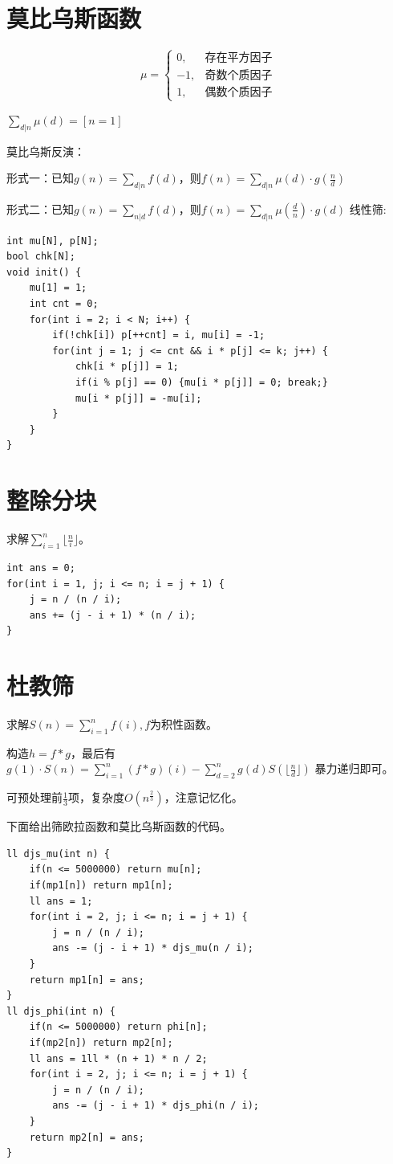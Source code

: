 \documentclass[a4paper,11pt,twoside,fontset = fandol,UTF8]{ctexbook} %
\begin{document}
	\section{莫比乌斯函数}
	$$
	\mu=\left\{
	\begin{aligned}
	0,&\text{存在平方因子}\\
	-1,&\text{奇数个质因子}\\
	1,&\text{偶数个质因子}
	\end{aligned}
	\right.
	$$
	
	$\sum_{d|n}\mu(d)=[n=1]$
	
	
	莫比乌斯反演：
	
	形式一：已知$g(n)=\sum_{d|n}f(d)$，则$f(n)=\sum_{d|n}\mu(d)\cdot g(\frac{n}{d})$
	
	形式二：已知$g(n)=\sum_{n|d}f(d)$，则$f(n)=\sum_{d|n}\mu(\frac{d}{n})\cdot g(d)$
	线性筛:
	\begin{lstlisting}
int mu[N], p[N];
bool chk[N];
void init() {
    mu[1] = 1;
    int cnt = 0;
    for(int i = 2; i < N; i++) {
        if(!chk[i]) p[++cnt] = i, mu[i] = -1;
        for(int j = 1; j <= cnt && i * p[j] <= k; j++) {
            chk[i * p[j]] = 1;
            if(i % p[j] == 0) {mu[i * p[j]] = 0; break;}
            mu[i * p[j]] = -mu[i];
        }
    }
} 
	\end{lstlisting}
	\section{整除分块}
	求解$\sum_{i=1}^n\lfloor\frac{n}{i}\rfloor$。
	\begin{lstlisting}
int ans = 0;
for(int i = 1, j; i <= n; i = j + 1) {
    j = n / (n / i);
    ans += (j - i + 1) * (n / i);
}
	\end{lstlisting}
	\section{杜教筛}
	求解$S(n)=\sum_{i=1}^n f(i),f$为积性函数。
	
	构造$h=f*g$，最后有$g(1)\cdot S(n)=\sum_{i=1}^n (f*g)(i)-\sum_{d=2}^n g(d)S(\lfloor\frac{n}{d}\rfloor)$
	暴力递归即可。
	
	可预处理前$\frac{1}{3}$项，复杂度$O(n^\frac{2}{3})$，注意记忆化。
	
	下面给出筛欧拉函数和莫比乌斯函数的代码。
	\begin{lstlisting}
ll djs_mu(int n) {
    if(n <= 5000000) return mu[n];
    if(mp1[n]) return mp1[n];
    ll ans = 1;
    for(int i = 2, j; i <= n; i = j + 1) {
        j = n / (n / i);
        ans -= (j - i + 1) * djs_mu(n / i);
    }
    return mp1[n] = ans;
}
ll djs_phi(int n) {
    if(n <= 5000000) return phi[n];
    if(mp2[n]) return mp2[n];
    ll ans = 1ll * (n + 1) * n / 2;
    for(int i = 2, j; i <= n; i = j + 1) {
        j = n / (n / i);
        ans -= (j - i + 1) * djs_phi(n / i);
    }
    return mp2[n] = ans;
}
	\end{lstlisting}
\end{document}
